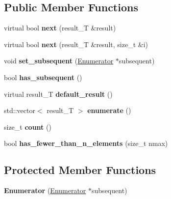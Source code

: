 \subsection*{Public Member Functions}
\begin{DoxyCompactItemize}
\item 
virtual bool {\bfseries next} (result\+\_\+T \&result)\hypertarget{classEnumerator_a8ef6adfaa42901cb007eceef976b2634}{}\label{classEnumerator_a8ef6adfaa42901cb007eceef976b2634}

\item 
virtual bool {\bfseries next} (result\+\_\+T \&result, size\+\_\+t \&i)\hypertarget{classEnumerator_a7f820d7df4327fee1fd3a04ccae5d0bc}{}\label{classEnumerator_a7f820d7df4327fee1fd3a04ccae5d0bc}

\item 
void {\bfseries set\+\_\+subsequent} (\hyperlink{classEnumerator}{Enumerator} $\ast$subsequent)\hypertarget{classEnumerator_ae19248dcf830648c75afcdcc6c2416a5}{}\label{classEnumerator_ae19248dcf830648c75afcdcc6c2416a5}

\item 
bool {\bfseries has\+\_\+subsequent} ()\hypertarget{classEnumerator_a5b31a40fed7827f62084b8f56b48e243}{}\label{classEnumerator_a5b31a40fed7827f62084b8f56b48e243}

\item 
virtual result\+\_\+T {\bfseries default\+\_\+result} ()\hypertarget{classEnumerator_a25a7f1ec275d165f5e37e555861450c5}{}\label{classEnumerator_a25a7f1ec275d165f5e37e555861450c5}

\item 
std\+::vector$<$ result\+\_\+T $>$ {\bfseries enumerate} ()\hypertarget{classEnumerator_a7214314662f3c7ec12f72552a9426ed0}{}\label{classEnumerator_a7214314662f3c7ec12f72552a9426ed0}

\item 
size\+\_\+t {\bfseries count} ()\hypertarget{classEnumerator_a19a17aeb516edf558c9188625c52984a}{}\label{classEnumerator_a19a17aeb516edf558c9188625c52984a}

\item 
bool {\bfseries has\+\_\+fewer\+\_\+than\+\_\+n\+\_\+elements} (size\+\_\+t nmax)\hypertarget{classEnumerator_a1268f2dba0f3d90d1b73f137c488edb8}{}\label{classEnumerator_a1268f2dba0f3d90d1b73f137c488edb8}

\end{DoxyCompactItemize}
\subsection*{Protected Member Functions}
\begin{DoxyCompactItemize}
\item 
{\bfseries Enumerator} (\hyperlink{classEnumerator}{Enumerator} $\ast$subsequent)\hypertarget{classEnumerator_a23d1457bda02cdd5dec929c69a469d29}{}\label{classEnumerator_a23d1457bda02cdd5dec929c69a469d29}

\end{DoxyCompactItemize}
